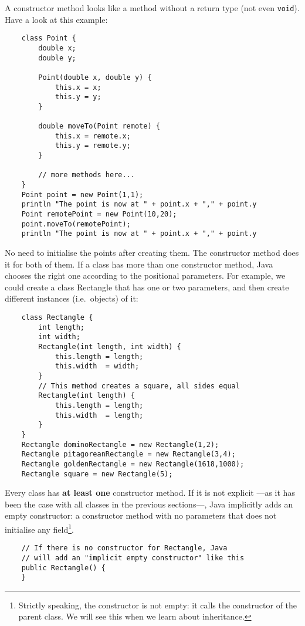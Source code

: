 A constructor method looks like a method without a return type (not
even \verb+void+). Have a look at this example:

\begin{verbatim}
    class Point {
        double x;
        double y;
        
        Point(double x, double y) {
            this.x = x;
            this.y = y;
        }
        
        double moveTo(Point remote) {
            this.x = remote.x;
            this.y = remote.y;
        }
        
        // more methods here...
    }
    Point point = new Point(1,1);
    println "The point is now at " + point.x + "," + point.y
    Point remotePoint = new Point(10,20);
    point.moveTo(remotePoint);
    println "The point is now at " + point.x + "," + point.y
\end{verbatim}

No need to initialise the points after creating them. The constructor
method does it for both of them. 
If a class has more than one constructor method, Java chooses the
right one according to the positional parameters. For example, we
could create a class Rectangle that has one or two parameters, and
then create different instances (i.e.~objects) of it: 

\begin{verbatim}
    class Rectangle {
        int length;
        int width;
        Rectangle(int length, int width) {
            this.length = length;
            this.width  = width;
        }
        // This method creates a square, all sides equal
        Rectangle(int length) {
            this.length = length;
            this.width  = length;
        }
    }
    Rectangle dominoRectangle = new Rectangle(1,2);
    Rectangle pitagoreanRectangle = new Rectangle(3,4);
    Rectangle goldenRectangle = new Rectangle(1618,1000);
    Rectangle square = new Rectangle(5); 
\end{verbatim}

Every class has 
\textbf{at least one} constructor method. 
If it is not explicit ---as it has been
the case with all classes in the previous sections---, Java 
implicitly adds an empty
constructor: a constructor method with no parameters that does not
initialise any field\footnote{Strictly speaking, the constructor is
  not empty: it calls the constructor of the parent class. We will see
  this when we learn about inheritance.}. 

\begin{verbatim}
    // If there is no constructor for Rectangle, Java 
    // will add an "implicit empty constructor" like this
    public Rectangle() {
    }
\end{verbatim}


